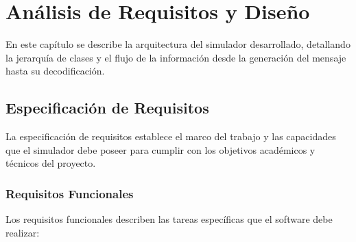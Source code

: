 \chapter{Análisis de Requisitos y Diseño}
\label{cap:diseno}
En este capítulo se describe la arquitectura del simulador desarrollado, detallando la jerarquía de clases y el flujo de la información desde la generación del mensaje hasta su decodificación.

\section{Especificación de Requisitos}
La especificación de requisitos establece el marco del trabajo y las capacidades que el simulador debe poseer para cumplir con los objetivos académicos y técnicos del proyecto.

\subsection{Requisitos Funcionales}
Los requisitos funcionales describen las tareas específicas que el software debe realizar:

